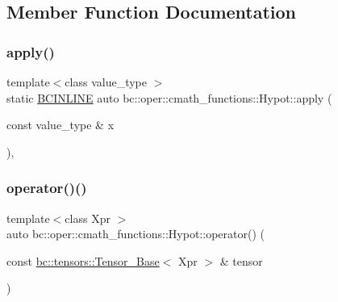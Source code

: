 \subsection{Member Function Documentation}
\mbox{\label{structbc_1_1oper_1_1cmath__functions_1_1Hypot_a4f4b179ec9192cf36931c84abc3e3f5c}} 
\subsubsection{\texorpdfstring{apply()}{apply()}}
{\footnotesize\ttfamily template$<$class value\+\_\+type $>$ \\
static \hyperlink{common_8h_a6699e8b0449da5c0fafb878e59c1d4b1}{B\+C\+I\+N\+L\+I\+NE} auto bc\+::oper\+::cmath\+\_\+functions\+::\+Hypot\+::apply (\begin{DoxyParamCaption}\item[{const value\+\_\+type \&}]{x }\end{DoxyParamCaption})\hspace{0.3cm}{\ttfamily [inline]}, {\ttfamily [static]}}

\mbox{\label{structbc_1_1oper_1_1cmath__functions_1_1Hypot_a6f7105f02ef66de5ef4ccdeac3a1e83c}} 
\subsubsection{\texorpdfstring{operator()()}{operator()()}\hspace{0.1cm}{\footnotesize\ttfamily [1/3]}}
{\footnotesize\ttfamily template$<$class Xpr $>$ \\
auto bc\+::oper\+::cmath\+\_\+functions\+::\+Hypot\+::operator() (\begin{DoxyParamCaption}\item[{const \hyperlink{classbc_1_1tensors_1_1Tensor__Base}{bc\+::tensors\+::\+Tensor\+\_\+\+Base}$<$ Xpr $>$ \&}]{tensor }\end{DoxyParamCaption})\hspace{0.3cm}{\ttfamily [inline]}}

